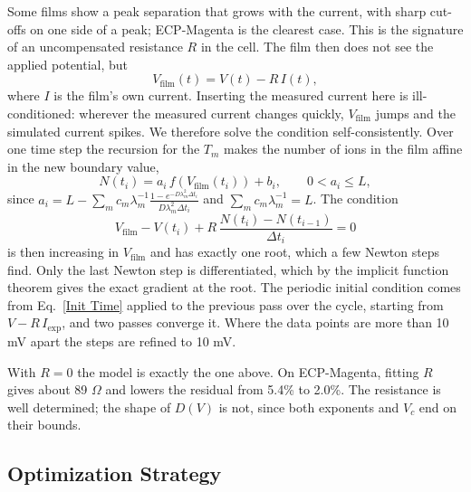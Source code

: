 \documentclass{article}
\begin{document}
Some films show a peak separation that grows with the current, with sharp cut-offs on one side of a peak; ECP-Magenta is the clearest case. This is the signature of an uncompensated resistance $R$ in the cell. The film then does not see the applied potential, but
\begin{equation}
    V_{\text{film}}(t) = V(t) - R\,I(t),
\end{equation}
where $I$ is the film's own current. Inserting the measured current here is ill-conditioned: wherever the measured current changes quickly, $V_{\text{film}}$ jumps and the simulated current spikes. We therefore solve the condition self-consistently. Over one time step the recursion for the $T_m$ makes the number of ions in the film affine in the new boundary value,
\begin{equation}
    N(t_i) = a_i\, f\!\left(V_{\text{film}}(t_i)\right) + b_i, \qquad 0 < a_i \le L,
\end{equation}
since $a_i = L - \sum_m c_m \lambda_m^{-1} \frac{1 - e^{-D\lambda_m^2\Delta t_i}}{D\lambda_m^2\Delta t_i}$ and $\sum_m c_m\lambda_m^{-1} = L$. The condition
\begin{equation}
    V_{\text{film}} - V(t_i) + R\,\frac{N(t_i) - N(t_{i-1})}{\Delta t_i} = 0
\end{equation}
is then increasing in $V_{\text{film}}$ and has exactly one root, which a few Newton steps find. Only the last Newton step is differentiated, which by the implicit function theorem gives the exact gradient at the root. The periodic initial condition comes from Eq.~\ref{Init Time} applied to the previous pass over the cycle, starting from $V - R\,I_{\text{exp}}$, and two passes converge it. Where the data points are more than 10 mV apart the steps are refined to 10 mV.

With $R = 0$ the model is exactly the one above. On ECP-Magenta, fitting $R$ gives about 89 $\Omega$ and lowers the residual from 5.4\% to 2.0\%. The resistance is well determined; the shape of $D(V)$ is not, since both exponents and $V_c$ end on their bounds.

\subsection{Optimization Strategy}
\end{document}
